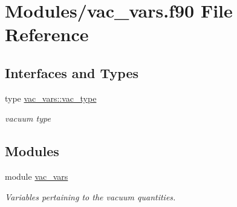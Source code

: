 \hypertarget{vac__vars_8f90}{}\section{Modules/vac\+\_\+vars.f90 File Reference}
\label{vac__vars_8f90}
\subsection*{Interfaces and Types}
\begin{DoxyCompactItemize}
\item 
type \hyperlink{structvac__vars_1_1vac__type}{vac\+\_\+vars\+::vac\+\_\+type}
\begin{DoxyCompactList}\small\item\em vacuum type \end{DoxyCompactList}\end{DoxyCompactItemize}
\subsection*{Modules}
\begin{DoxyCompactItemize}
\item 
module \hyperlink{namespacevac__vars}{vac\+\_\+vars}
\begin{DoxyCompactList}\small\item\em Variables pertaining to the vacuum quantities. \end{DoxyCompactList}\end{DoxyCompactItemize}

